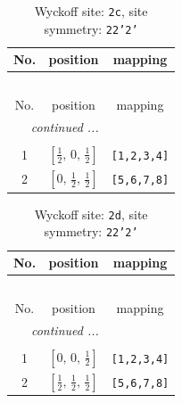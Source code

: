 \documentclass[fleqn,8pt]{jsarticle}
\begin{document}
\begin{longtable}{ccc}
\caption{Wyckoff site: {\tt 2c}, site symmetry: {\tt 22'2'}}
 \\
 \hline \hline
No. & position & mapping \\ \hline \endfirsthead

\multicolumn{2}{l}{\tablename\ \thetable{}} \\
 \hline \hline
No. & position & mapping \\ \hline \endhead

 \hline \hline
\multicolumn{2}{r}{\footnotesize\it continued ...} \\ \endfoot

 \hline \hline
\multicolumn{2}{r}{} \\ \endlastfoot

1 & $\left[ \frac{1}{2},\, 0,\, \frac{1}{2} \right]$ & {\tt [1,2,3,4]} \\ \hline
2 & $\left[ 0,\, \frac{1}{2},\, \frac{1}{2} \right]$ & {\tt [5,6,7,8]} \\
\end{longtable}
\renewcommand{\arraystretch}{1.2}
\begin{longtable}{ccc}
\caption{Wyckoff site: {\tt 2d}, site symmetry: {\tt 22'2'}}
 \\
 \hline \hline
No. & position & mapping \\ \hline \endfirsthead

\multicolumn{2}{l}{\tablename\ \thetable{}} \\
 \hline \hline
No. & position & mapping \\ \hline \endhead

 \hline \hline
\multicolumn{2}{r}{\footnotesize\it continued ...} \\ \endfoot

 \hline \hline
\multicolumn{2}{r}{} \\ \endlastfoot

1 & $\left[ 0,\, 0,\, \frac{1}{2} \right]$ & {\tt [1,2,3,4]} \\ \hline
2 & $\left[ \frac{1}{2},\, \frac{1}{2},\, \frac{1}{2} \right]$ & {\tt [5,6,7,8]} \\
\end{longtable}
\renewcommand{\arraystretch}{1.2}
\end{document}
